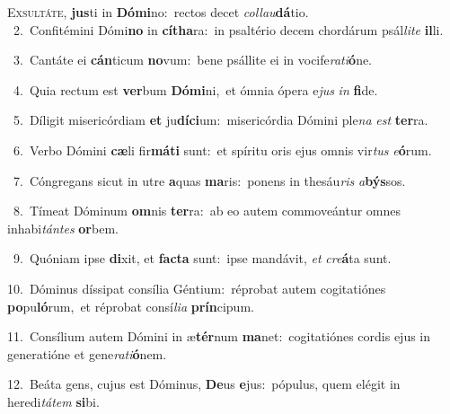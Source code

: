\lettrine{\initial\textcolor{\initialcolor}{E}}{xsultáte,} \textbf{jus}\-ti in \textbf{Dó}\-\textbf{mi}no:~\star rectos decet \textit{col}\-\textit{lau}\textbf{dá}tio.\\
{\numbfont\textcolor{\numbcolor}{~2.}}~Confitémini Dómi\textbf{no} in \textbf{cí}\-\textbf{tha}ra:~\star in psaltério decem chordárum psál\-\textit{li}\-\textit{te} \textbf{il}\-li.\par
{\numbfont\textcolor{\numbcolor}{~3.}}~Cantáte ei \textbf{cán}\-ticum \textbf{no}\-vum:~\star bene psállite ei in vocife\-\textit{ra}\-\textit{ti}\textbf{ó}ne.\par
{\numbfont\textcolor{\numbcolor}{~4.}}~Quia rectum est \textbf{ver}\-bum \textbf{Dó}\-\textbf{mi}ni,~\star et ómnia ópera e\textit{jus} \textit{in} \textbf{fi}\-de.\par
{\numbfont\textcolor{\numbcolor}{~5.}}~Díligit misericórdiam \textbf{et} ju\-\textbf{dí}\-\textbf{ci}um:~\star misericórdia Dómini ple\textit{na} \textit{est} \textbf{ter}\-ra.\par
{\numbfont\textcolor{\numbcolor}{~6.}}~Verbo Dómini \textbf{cæ}\-li fir\-\textbf{má}\-\textbf{ti} sunt:~\star et spíritu oris ejus omnis vir\textit{tus} \textit{e}\-\textbf{ó}rum.\par
{\numbfont\textcolor{\numbcolor}{~7.}}~Cóngregans sicut in utre \textbf{a}\-quas \textbf{ma}\-ris:~\star ponens in thesáu\textit{ris} \textit{a}\-\textbf{býs}sos.\par
{\numbfont\textcolor{\numbcolor}{~8.}}~Tímeat Dóminum \textbf{om}\-nis \textbf{ter}\-ra:~\star ab eo autem commoveántur omnes inhabi\-\textit{tán}\-\textit{tes} \textbf{or}\-bem.\par
{\numbfont\textcolor{\numbcolor}{~9.}}~Quóniam ipse \textbf{di}\-xit, et \textbf{fac}\-\textbf{ta} sunt:~\star ipse mandávit, \textit{et} \textit{cre}\-\textbf{á}ta sunt.\par
{\numbfont\textcolor{\numbcolor}{10.}}~Dóminus díssipat consília Géntium:~\dagger réprobat autem cogitatiónes \textbf{po}\-pu\-\textbf{ló}\-rum,~\star et réprobat consí\-\textit{li}\-\textit{a} \textbf{prín}\-cipum.\par
{\numbfont\textcolor{\numbcolor}{11.}}~Consílium autem Dómini in æ\-\textbf{tér}\-num \textbf{ma}\-net:~\star cogitatiónes cordis ejus in generatióne et gene\-\textit{ra}\-\textit{ti}\textbf{ó}nem.\par
{\numbfont\textcolor{\numbcolor}{12.}}~Beáta gens, cujus est Dóminus, \textbf{De}\-us \textbf{e}\-jus:~\star pópulus, quem elégit in heredi\-\textit{tá}\-\textit{tem} \textbf{si}\-bi.\par
